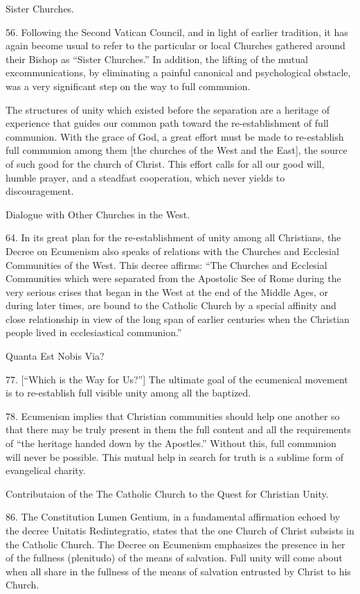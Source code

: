 \documentclass[oneside]{book}
\begin{document}
Sister Churches. 

56. Following the Second Vatican Council, and in light of earlier tradition, it
has again become usual to refer to the particular or local Churches gathered
around their Bishop as ``Sister Churches.'' In addition, the lifting of the
mutual excommunications, by eliminating a painful canonical and psychological
obstacle, was a very significant step on the way to full communion.

The structures of unity which existed before the separation are a heritage of
experience that guides our common path toward the re-establishment of full
communion. With the grace of God, a great effort must be made to re-establish
full communion among them [the churches of the West and the East], the source of
such good for the church of Christ. This effort calls for all our good will,
humble prayer, and a steadfast cooperation, which never yields to
discouragement.

Dialogue with Other Churches in the West. 

64. In its great plan for the re-establishment of unity among all Christians,
the Decree on Ecumenism also speaks of relations with the Churches and Ecclesial
Communities of the West. This decree affirms: ``The Churches and Ecclesial
Communities which were separated from the Apostolic See of Rome during the very
serious crises that began in the West at the end of the Middle Ages, or during
later times, are bound to the Catholic Church by a special affinity and close
relationship in view of the long span of earlier centuries when the Christian
people lived in ecclesiastical communion.''

Quanta Est Nobis Via?

77. [``Which is the Way for Us?'']  The ultimate goal of the ecumenical
movement is to re-establish full visible unity among all the baptized.

78. Ecumenism implies that Christian communities should help one another so
that there may be truly present in them the full content and all the
requirements of ``the heritage handed down by the Apostles.'' Without this, full
communion will never be possible. This mutual help in search for truth is a
sublime form of evangelical charity.

Contributaion of the The Catholic Church to the Quest for Christian Unity. 

86. The Constitution Lumen Gentium, in a fundamental affirmation echoed by the
decree Unitatis Redintegratio, states that the one Church of Christ subsists in
the Catholic Church. The Decree on Ecumenism emphasizes the presence in her of
the fullness (plenitudo) of the means of salvation. Full unity will come about
when all share in the fullness of the means of salvation entrusted by Christ to
his Church.
\end{document}
